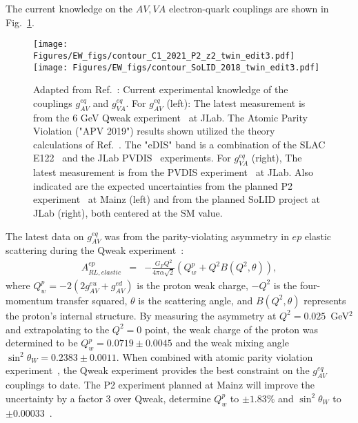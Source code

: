 The current knowledge on the $AV,VA$ electron-quark couplings are shown in Fig.~\ref{fig:c1c2}. 
\begin{figure}[t]
\texttt{[image: Figures/EW\_figs/contour\_C1\_2021\_P2\_z2\_twin\_edit3.pdf]}
\texttt{[image: Figures/EW\_figs/contour\_SoLID\_2018\_twin\_edit3.pdf]}
\caption{Adapted from Ref.~\cite{Zheng:2021hcf}: Current experimental knowledge of the couplings $g_{AV}^{eq}$ and $g_{VA}^{eq}$. 
For $g_{AV}^{eq}$ (left): The latest measurement is from the 6 GeV Qweak experiment~\cite{Androic:2018kni} at JLab. The Atomic Parity Violation ("APV 2019") results shown utilized the theory calculations of Ref.~\cite{Toh:2019iro}. The "eDIS" band is a combination of the SLAC E122~\cite{Prescott:1978tm,Prescott:1979dh} and the JLab PVDIS~\cite{Wang:2014bba,Wang:2014guo} experiments. 
For $g_{VA}^{eq}$ (right), 
The latest measurement is from the PVDIS experiment~\cite{Wang:2014bba,Wang:2014guo} at JLab. 
Also indicated are the expected uncertainties from the planned P2 experiment~\cite{Becker:2018ggl} at Mainz (left) and from the planned SoLID project at JLab (right), both centered at the SM value. }
\label{fig:c1c2}
\end{figure}
%
The latest data on $g_{AV}^{eq}$ was from the parity-violating asymmetry in $ep$ elastic scattering during the Qweak experiment~\cite{Androic:2013rhu,Androic:2018kni}: 
\begin{eqnarray}
 A_{RL, elastic}^{ep} &=& - \frac{G_F Q^2}{4\pi\alpha\sqrt{2}} \left(Q_w^p+Q^2 B(Q^2,\theta)\right),
\end{eqnarray}
where $Q_w^p=-2(2g_{AV}^{eu}+g_{AV}^{ed})$ is the proton weak charge, $-Q^2$ is the four-momentum transfer squared, $\theta$ is the scattering angle, and $B(Q^2,\theta)$ represents the proton's internal structure. By measuring the asymmetry at $Q^2=0.025$~GeV$^2$ and extrapolating to the $Q^2=0$ point, the weak charge of the proton was determined to be $Q_w^p=0.0719\pm 0.0045$ and the weak mixing angle $\sin^2\theta_W=0.2383\pm 0.0011$. When combined with atomic parity violation experiment~\cite{Wood:1997zq,Guena:2005uj,Toh:2019iro}, the Qweak experiment provides the best constraint on the $g_{AV}^{eq}$ couplings to date. The P2 experiment planned at Mainz will improve the uncertainty by a factor 3 over Qweak, determine $Q_w^p$ to $\pm 1.83\%$ and $\sin^2\theta_W$ to $\pm 0.00033$~\cite{Becker:2018ggl}.

